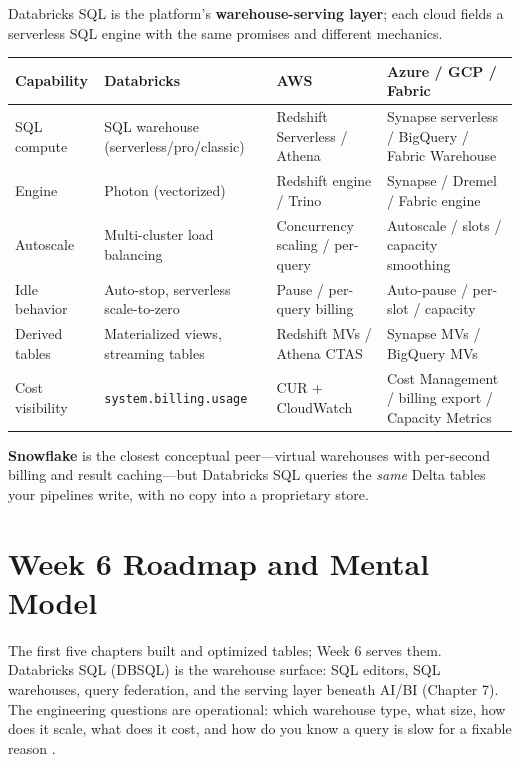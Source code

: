 \begin{crosscloud}
Databricks SQL is the platform's \textbf{warehouse-serving layer}; each cloud fields a serverless
SQL engine with the same promises and different mechanics.

\vspace{2mm}
{\footnotesize
\begin{tabular}{@{}p{3.0cm}p{3.4cm}p{3.2cm}p{3.2cm}@{}}
\toprule
\textbf{Capability} & \textbf{Databricks} & \textbf{AWS} & \textbf{Azure / GCP / Fabric} \\
\midrule
SQL compute & SQL warehouse (serverless/pro/classic) & Redshift Serverless / Athena & Synapse serverless / BigQuery / Fabric Warehouse \\
Engine & Photon (vectorized) & Redshift engine / Trino & Synapse / Dremel / Fabric engine \\
Autoscale & Multi-cluster load balancing & Concurrency scaling / per-query & Autoscale / slots / capacity smoothing \\
Idle behavior & Auto-stop, serverless scale-to-zero & Pause / per-query billing & Auto-pause / per-slot / capacity \\
Derived tables & Materialized views, streaming tables & Redshift MVs / Athena CTAS & Synapse MVs / BigQuery MVs \\
Cost visibility & \texttt{system.billing.usage} & CUR + CloudWatch & Cost Management / billing export / Capacity Metrics \\
\bottomrule
\end{tabular}}

\vspace{1mm}
\textbf{Snowflake} is the closest conceptual peer---virtual warehouses with per-second billing and
result caching---but Databricks SQL queries the \emph{same} Delta tables your pipelines write,
with no copy into a proprietary store.
\end{crosscloud}

\section{Week 6 Roadmap and Mental Model}
The first five chapters built and optimized tables; Week 6 serves them. Databricks SQL (DBSQL) is the warehouse surface: SQL editors, SQL warehouses, query federation, and the serving layer beneath AI/BI (Chapter 7). The engineering questions are operational: which warehouse type, what size, how does it scale, what does it cost, and how do you know a query is slow for a fixable reason \cite{databricksSQL,databricksSQLWarehouses}.

